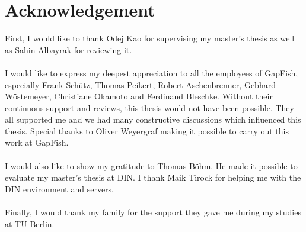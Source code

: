 \section*{Acknowledgement}

First, I would like to thank Odej Kao for supervising my master's
thesis as well as Sahin Albayrak for reviewing it.
\\\\
I would like to express my deepest appreciation to all the employees
of GapFish, especially Frank Schütz, Thomas Peikert, Robert
Aschenbrenner, Gebhard Wöstemeyer, Christiane Okamoto and Ferdinand
Bleschke. Without their continuous support and reviews, this thesis
would not have been possible. They all supported me and we had many
constructive discussions which influenced this thesis. Special thanks
to Oliver Weyergraf making it possible to carry out this work at
GapFish.
\\\\
I would also like to show my gratitude to Thomas Böhm. He made it
possible to evaluate my master's thesis at DIN. I thank Maik Tirock for
helping me with the DIN environment and servers.
\\\\
Finally, I would thank my family for the support they gave me during
my studies at TU Berlin.
\clearpage
